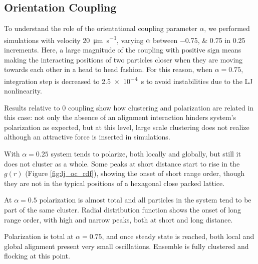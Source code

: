 \documentclass[../../master_thesis_np.tex]{subfiles}
\begin{document}
		\subsection{Orientation Coupling}
		To understand the role of the orientational coupling parameter $\alpha$, we performed simulations with velocity \SI{20}{\um\per\second}, varying $\alpha$ between \numlist{-0.75; 0.75} in \num{0.25} increments. 
		Here, a large magnitude of the coupling with positive sign means making the interacting positions of two particles closer when they are moving towards each other in a head to head fashion.
		For this reason, when $\alpha = 0.75$, integration step is decreased to \SI{2.5e-4}{\second} to avoid instabilities due to the LJ nonlinearity.
		
		Results relative to \num{0} coupling show how clustering and polarization are related in this case: not only the absence of an alignment interaction hinders system's polarization as expected, but at this level, large scale clustering does not realize although an attractive force is inserted in simulations.
		
		With $\alpha = 0.25$ system tends to polarize, both locally and globally, but still it does not cluster as a whole. 
		Some peaks at short distance start to rise in the $g(r)$ (Figure \ref{fig:lj_oc_rdf}), showing the onset of short range order, though they are not in the typical positions of a hexagonal close packed lattice.
		
		At $\alpha = 0.5$ polarization is almost total and all particles in the system tend to be part of the same cluster.
		Radial distribution function shows the onset of long range order, with high and narrow peaks, both at short and long distance.
		
		Polarization is total at $\alpha = 0.75$, and once steady state is reached, both local and global alignment present very small oscillations.
		Ensemble is fully clustered and flocking at this point.
		
\end{document}
